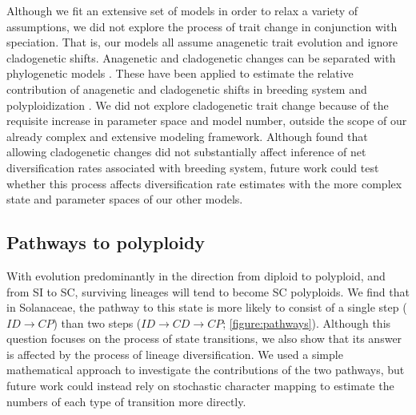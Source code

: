 Although we fit an extensive set of models in order to relax a variety of assumptions, we did not explore the process of trait change in conjunction with speciation.
That is, our models all assume anagenetic trait evolution and ignore cladogenetic shifts.
Anagenetic and cladogenetic changes can be separated with phylogenetic models \citep{mayrose_2011, goldberg_2012, magnuson-ford_2012}. 
These have been applied to estimate the relative contribution of anagenetic and cladogenetic shifts in breeding system \citep{goldberg_2012} and polyploidization \citep{zhan_2016, freyman_2019}.
We did not explore cladogenetic trait change because of the requisite increase in parameter space and model number, outside the scope of our already complex and extensive modeling framework. %
Although \citet{goldberg_2012} found that allowing cladogenetic changes did not substantially affect inference of net diversification rates associated with breeding system, future work could test whether this process affects diversification rate estimates with the more complex state and parameter spaces of our other models.

\subsection{Pathways to polyploidy}

With evolution predominantly in the direction from diploid to polyploid, and from SI to SC, surviving lineages will tend to become SC polyploids.
We find that in Solanaceae, the pathway to this state is more likely to consist of a single step ($ID \rightarrow CP$) than two steps ($ID \rightarrow CD \rightarrow CP$; \cref{figure:pathways}).
Although this question focuses on the process of state transitions, we also show that its answer is affected by the process of lineage diversification.
We used a simple mathematical approach to investigate the contributions of the two pathways, but future work could instead rely on stochastic character mapping to estimate the numbers of each type of transition more directly.

